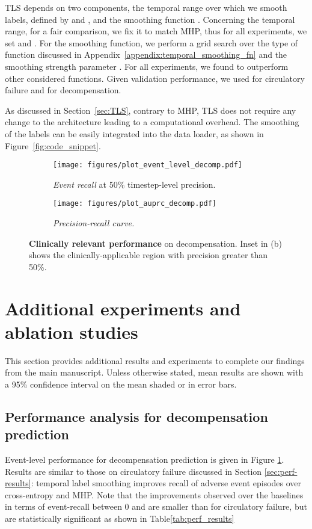 \documentclass[nohyperref]{article}
\begin{document}
TLS depends on two components, the temporal range over which we smooth labels, defined by  and , and the smoothing function . Concerning the temporal range, for a fair comparison, we fix it to match MHP, thus for all experiments, we set  and . For the smoothing function, we perform a grid search over the type of function discussed in Appendix~\ref{appendix:temporal_smoothing_fn} and the smoothing strength parameter . For all experiments, we found  to outperform other considered functions. Given validation performance, we used  for {circulatory failure} and  for {decompensation}.

As discussed in Section~\ref{sec:TLS}, contrary to MHP, TLS does not require any change to the architecture leading to a computational overhead. The smoothing of the labels can be easily integrated into the data loader, as shown in Figure~\ref{fig:code_snippet}. 

\begin{figure}[h]
\centering
\begin{subfigure}[b]{0.49\textwidth}
 \centering
  \texttt{[image: figures/plot\_event\_level\_decomp.pdf]}
  \caption{\textit{Event recall} at 50\% timestep-level precision.} \label{fig:event_decomp}
\end{subfigure}
\begin{subfigure}[b]{0.49\textwidth}
  \centering
  \texttt{[image: figures/plot\_auprc\_decomp.pdf]}
  \caption{\textit{Precision-recall curve.}}
  \label{fig:PR_curve_decomp}
\end{subfigure}
\caption{\textbf{Clinically relevant performance} on decompensation. Inset in (b) shows the clinically-applicable region with precision greater than 50\%.}
\label{fig:clinical_performance_decomp}
\end{figure}

\section{Additional experiments and ablation studies}
\label{appendix:add_exp}

This section provides additional results and experiments to complete our findings from the main manuscript. Unless otherwise stated, mean results are shown with a 95\% confidence interval on the mean shaded or in error bars.

\subsection{Performance analysis for decompensation prediction}
\label{appendix:decomp_results}
Event-level performance for decompensation prediction is given in Figure \ref{fig:event_decomp}. Results are similar to those on circulatory failure discussed in Section \ref{sec:perf-results}: temporal label smoothing improves recall of adverse event episodes over cross-entropy and MHP. Note that the improvements observed over the baselines in terms of event-recall between 0 and  are smaller than for circulatory failure, but are statistically significant as shown in Table\ref{tab:perf_results}
\end{document}
